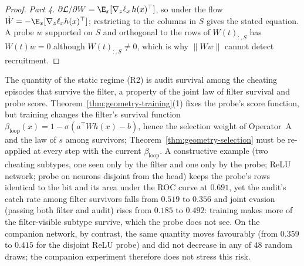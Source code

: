 \begin{proof}
\emph{Part 4.} $\partial \mathcal{L}/\partial W = \E_x[\nabla_z \ell_x\, h(x)^\top]$, so under the flow $\dot W = -\E_x[\nabla_z\ell_x h(x)^\top]$; restricting to the columns in $S$ gives the stated equation. A probe $w$ supported on $S$ and orthogonal to the rows of $W(t)_{:,S}$ has $W(t) w = 0$ although $W(t)_{:,S} \neq 0$, which is why $\|Ww\|$ cannot detect recruitment.
\end{proof}

\begin{remark}\label{rem:instrument-vs-audit}
The quantity of the static regime (R2) is audit survival among the cheating episodes that survive the filter, a property of the joint law of filter survival and probe score. Theorem~\ref{thm:geometry-training}(1) fixes the probe's score function, but training changes the filter's survival function $\beta_{\mathrm{loop}}(x) = 1 - \sigma(a^\top W h(x) - b)$, hence the selection weight of Operator~A and the law of $s$ among survivors; Theorem~\ref{thm:geometry-selection} must be re-applied at every step with the current $\beta_{\mathrm{loop}}$. A constructive example (two cheating subtypes, one seen only by the filter and one only by the probe; ReLU network; probe on neurons disjoint from the head) keeps the probe's rows identical to the bit and its area under the ROC curve at $0.691$, yet the audit's catch rate among filter survivors falls from $0.519$ to $0.356$ and joint evasion (passing both filter and audit) rises from $0.185$ to $0.492$: training makes more of the filter-visible subtype survive, which the probe does not see. On the companion network, by contrast, the same quantity moves favourably (from $0.359$ to $0.415$ for the disjoint ReLU probe) and did not decrease in any of $48$ random draws; the companion experiment therefore does not stress this risk.
\end{remark}

